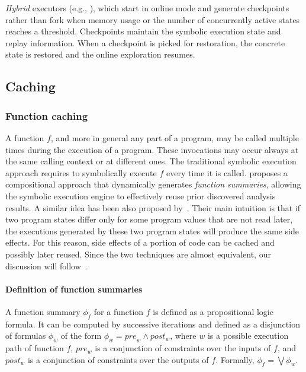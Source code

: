 {\em Hybrid} executors (e.g., \cite{MAYHEM-SP12}), which start in online mode and generate checkpoints rather than fork when memory usage or the number of concurrently active states reaches a threshold. Checkpoints maintain the symbolic execution state and replay information. When a checkpoint is picked for restoration, the concrete state is restored and the online exploration resumes.

\subsection{Caching} 
\label{caching}

\subsubsection{Function caching} A function $f$, and more in general any part of a program, may be called multiple times during the execution of a program. These invocations may occur always at the same calling context or at different ones. The traditional symbolic execution approach requires to symbolically execute $f$ every time it is called. \cite{G-POPL07} proposes a compositional approach that dynamically generates {\em function summaries}, allowing the symbolic execution engine to effectively reuse prior discovered analysis results. A similar idea has been also proposed by~\cite{BCE-TACAS08}. Their main intuition is that if two program states differ only for some program values that are not read later, the executions generated by these two program states will produce the same
side effects. For this reason, side effects of a portion of code can be cached and possibly later reused. Since the two techniques are almost equivalent, our discussion will follow~\cite{G-POPL07}. %

\paragraph{Definition of function summaries} A function summary $\phi_f$ for a function $f$ is defined as a propositional logic formula. It can be computed by successive iterations and defined as a disjunction of formulas $\phi_w$ of the form $\phi_w = {pre}_w \wedge post_w$, where $w$ is a possible execution path of function $f$, $pre_w$ is a conjunction of constraints over the inputs of $f$, and $post_w$ is a conjunction of constraints over the outputs of $f$. Formally, $\phi_f = \bigvee \phi_w$.  

